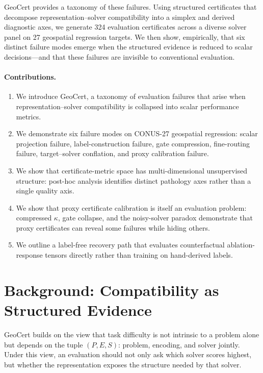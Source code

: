 \documentclass{article}
\begin{document}
GeoCert provides a taxonomy of these failures. Using structured certificates that decompose representation--solver compatibility into a simplex and derived diagnostic axes, we generate 324 evaluation certificates across a diverse solver panel on 27 geospatial regression targets. We then show, empirically, that six distinct failure modes emerge when the structured evidence is reduced to scalar decisions---and that these failures are invisible to conventional evaluation.

\paragraph{Contributions.}
\begin{enumerate}
    \item We introduce GeoCert, a taxonomy of evaluation failures that arise when representation--solver compatibility is collapsed into scalar performance metrics.
    \item We demonstrate six failure modes on CONUS-27 geospatial regression: scalar projection failure, label-construction failure, gate compression, fine-routing failure, target--solver conflation, and proxy calibration failure.
    \item We show that certificate-metric space has multi-dimensional unsupervised structure: post-hoc analysis identifies distinct pathology axes rather than a single quality axis.
    \item We show that proxy certificate calibration is itself an evaluation problem: compressed $\kappa$, gate collapse, and the noisy-solver paradox demonstrate that proxy certificates can reveal some failures while hiding others.
    \item We outline a label-free recovery path that evaluates counterfactual ablation-response tensors directly rather than training on hand-derived labels.
\end{enumerate}

\section{Background: Compatibility as Structured Evidence}

GeoCert builds on the view that task difficulty is not intrinsic to a problem alone but depends on the tuple $(P, E, S)$: problem, encoding, and solver jointly. Under this view, an evaluation should not only ask which solver scores highest, but whether the representation exposes the structure needed by that solver.
\end{document}
